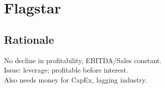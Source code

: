 \section{Flagstar}
	\subsection*{Rationale}
	No decline in profitability, EBITDA/Sales constant.\\
	Issue: leverage; profitable before interest.\\
	Also needs money for CapEx, lagging industry.
	
	